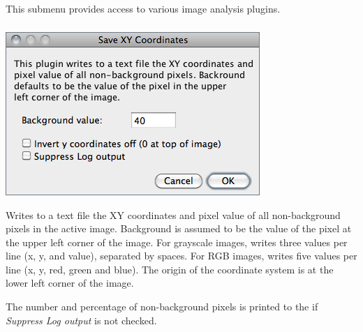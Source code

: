 \subsection{\protect{}\label{sub:Tools}}

This submenu provides access to various image analysis plugins.


\subsubsection{\protect{}}

\begin{minipage}[c][1\totalheight][t]{0.5\columnwidth}%
\includegraphics[scale=0.55]{images/SaveXYcoordinates}%
\end{minipage}%
\begin{minipage}[c][1\totalheight][t]{0.5\columnwidth}%
Writes to a text file the XY coordinates and pixel value of all non-background
pixels in the active image. Background is assumed to be the value
of the pixel at the upper left corner of the image. For grayscale
images, writes three values per line (x, y, and value), separated
by spaces. For RGB images, writes five values per line (x, y, red,
green and blue). The origin of the coordinate system is at the lower
left corner of the image.%
\end{minipage}

The number and percentage of non-background
pixels is printed to the {\small {}} if \emph{Suppress
Log output} is not checked.




\subsubsection{\protect{} \label{sub:Fractal-Box-Count...}}


